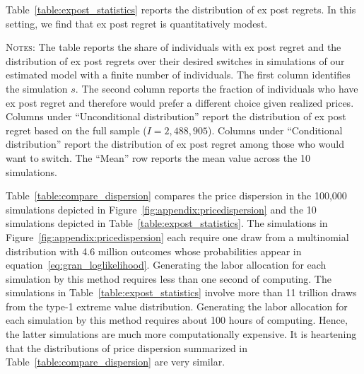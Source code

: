\documentclass[11pt]{article}
\theoremstyle{definition}
\begin{document}
Table~\ref{table:expost_statistics} reports the distribution of ex post regrets.
In this setting, we find that ex post regret is quantitatively modest.

\begin{table}[hp]
\caption{Distribution of ex post regrets}
\label{table:expost_statistics}
\vspace{-6mm}
\begin{center}
\resizebox{\textwidth}{!}{

}
\begin{minipage}{0.98\textwidth}
{\footnotesize \textsc{Notes}: 
The table reports the share of individuals with ex post regret and the distribution of ex post regrets over their desired switches in simulations of our estimated model with a finite number of individuals.
The first column identifies the simulation $s$.
The second column reports the fraction of individuals who have ex post regret and therefore would prefer a different choice given realized prices.
Columns under ``Unconditional distribution'' report the distribution of ex post regret based on the full sample ($I = 2,488,905$).
Columns under ``Conditional distribution'' report the distribution of ex post regret among those who would want to switch.
The ``Mean'' row reports the mean value across the 10 simulations.
\par}
\end{minipage}
\end{center}
\end{table}

Table~\ref{table:compare_dispersion} compares the price dispersion in
the 100,000 simulations depicted in Figure~\ref{fig:appendix:pricedispersion}
and
the 10 simulations depicted in Table~\ref{table:expost_statistics}.
The simulations in Figure~\ref{fig:appendix:pricedispersion} each require one draw from a multinomial distribution with 4.6 million outcomes whose probabilities appear in equation~\eqref{eq:gran_loglikelihood}.
Generating the labor allocation for each simulation by this method requires less than one second of computing.
The simulations in Table~\ref{table:expost_statistics} involve more than 11 trillion draws from the type-1 extreme value distribution.
Generating the labor allocation for each simulation by this method requires about 100 hours of computing.
Hence, the latter simulations are much more computationally expensive.
It is heartening that the distributions of price dispersion summarized in Table~\ref{table:compare_dispersion} are very similar.
\end{document}
